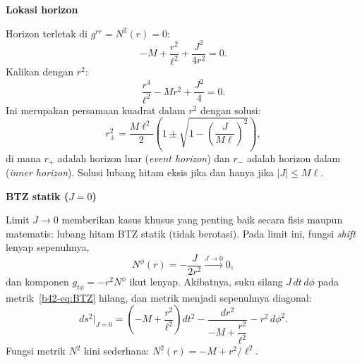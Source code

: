 \vspace{0.5em}
\noindent \textbf{Lokasi horizon}

Horizon terletak di $g^{rr} = N^2(r) = 0$:
\begin{equation}
    -M + \frac{r^2}{\ell^2} + \frac{J^2}{4r^2} = 0.
\end{equation}
Kalikan dengan $r^2$:
\begin{equation}
    \frac{r^4}{\ell^2} - Mr^2 + \frac{J^2}{4} = 0.
\end{equation}
Ini merupakan persamaan kuadrat dalam $r^2$ dengan solusi:
\begin{equation}
    r_{\pm}^2 = \frac{M\ell^2}{2}\left(1 \pm \sqrt{1 - \left(\frac{J}{M\ell}\right)^2}\right), \label{b42-eq:horizons}
\end{equation}
di mana $r_+$ adalah horizon luar (\emph{event horizon}) dan $r_-$ adalah horizon dalam (\emph{inner horizon}). Solusi lubang hitam eksis jika dan hanya jika $|J| \leq M\ell$.

\vspace{0.5em}
\noindent \textbf{BTZ statik ($J = 0$)}

Limit $J \to 0$ memberikan kasus khusus yang penting baik secara fisis maupun matematis: lubang hitam BTZ statik (tidak berotasi). Pada limit ini, fungsi \textit{shift} lenyap sepenuhnya,
\begin{equation}\label{b42-eq:Nphi-zero}
    N^\phi(r) = -\frac{J}{2r^2} \xrightarrow{J \to 0} 0,
\end{equation}
dan komponen $g_{t\phi} = -r^2 N^\phi$ ikut lenyap. Akibatnya, suku silang $J\,dt\,d\phi$ pada metrik~\eqref{b42-eq:BTZ} hilang, dan metrik menjadi sepenuhnya diagonal:
\begin{equation}\label{b42-eq:BTZ-static}
    ds^2 \Big|_{J=0} = \left(-M + \frac{r^2}{\ell^2}\right)dt^2 - \frac{dr^2}{-M + \dfrac{r^2}{\ell^2}} - r^2\,d\phi^2.
\end{equation}
Fungsi metrik $N^2$ kini sederhana: $N^2(r) = -M + r^2/\ell^2$.

